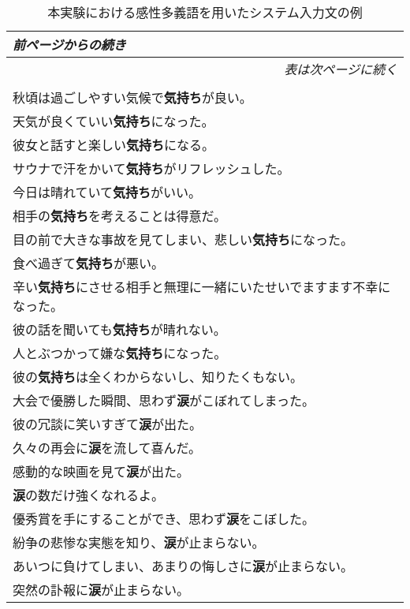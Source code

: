 \begin{longtable}[C]{|l|}
	\caption{本実験における感性多義語を用いたシステム入力文の例}
	\label{table:kansei_tagi_input_list}
	\\
	\endfirsthead
	\multicolumn{1}{l}{\small\it 前ページからの続き}\\
 	\endhead
	\multicolumn{1}{r}{\small\it 表は次ページに続く}\\
	\endfoot
	\multicolumn{1}{r}{\small\it これで終わり}\\
 	\endlastfoot
	\hline
	秋頃は過ごしやすい気候で\textbf{気持ち}が良い。 \\
	\hline
	天気が良くていい\textbf{気持ち}になった。 \\
	\hline
	彼女と話すと楽しい\textbf{気持ち}になる。\\
	\hline
	サウナで汗をかいて\textbf{気持ち}がリフレッシュした。\\
	\hline
	今日は晴れていて\textbf{気持ち}がいい。\\
	\hline
	相手の\textbf{気持ち}を考えることは得意だ。\\
	\hline
	目の前で大きな事故を見てしまい、悲しい\textbf{気持ち}になった。\\
	\hline
	食べ過ぎて\textbf{気持ち}が悪い。\\
	\hline
	辛い\textbf{気持ち}にさせる相手と無理に一緒にいたせいでますます不幸になった。\\
	\hline
	彼の話を聞いても\textbf{気持ち}が晴れない。\\
	\hline
	人とぶつかって嫌な\textbf{気持ち}になった。\\
	\hline
	彼の\textbf{気持ち}は全くわからないし、知りたくもない。\\
	\hline
	大会で優勝した瞬間、思わず\textbf{涙}がこぼれてしまった。\\
	\hline
	彼の冗談に笑いすぎて\textbf{涙}が出た。\\
	\hline
	久々の再会に\textbf{涙}を流して喜んだ。\\
	\hline
	感動的な映画を見て\textbf{涙}が出た。\\
	\hline
	\textbf{涙}の数だけ強くなれるよ。\\
	\hline
	優秀賞を手にすることができ、思わず\textbf{涙}をこぼした。\\
	\hline
	紛争の悲惨な実態を知り、\textbf{涙}が止まらない。\\
	\hline
	あいつに負けてしまい、あまりの悔しさに\textbf{涙}が止まらない。\\
	\hline
	突然の訃報に\textbf{涙}が止まらない。\\

\end{longtable}
